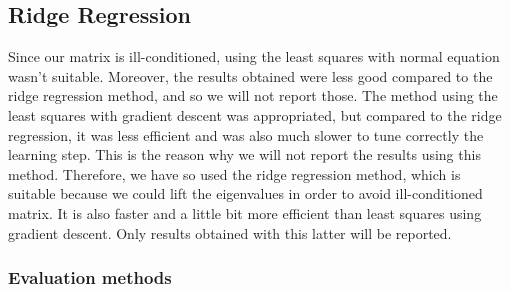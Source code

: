 \documentclass{article} %
\begin{document}
\begin{figure}[!ht]
\hfill
{} \label{fig:models}
\caption{}
\end{figure}

\subsection{Ridge Regression}

Since our matrix is ill-conditioned, using the least squares with normal equation wasn't suitable. Moreover, the results obtained were less good compared to the ridge regression method, and so we will not report those. The method using the least squares with gradient descent was appropriated, but compared to the ridge regression, it was less efficient and was also much slower to tune correctly the learning step. This is the reason why we will not report the results using this method. Therefore, we have so used the ridge regression method, which is suitable because we could lift the eigenvalues in order to avoid ill-conditioned matrix. It is also faster and a little bit more efficient than least squares using gradient descent. Only results obtained with this latter will be reported.

\subsubsection{Evaluation methods}
\end{document}
